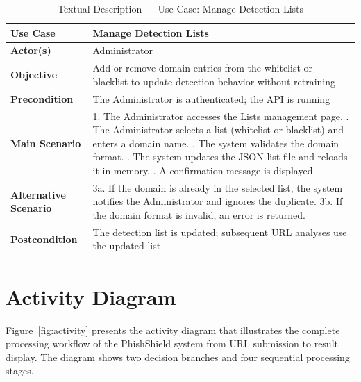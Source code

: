 \begin{table}[H]
\caption{Textual Description — Use Case: Manage Detection Lists}
\label{tab:uc2}
\vspace{4pt}
\centering
\begin{tabular}{|p{3.5cm}|p{9cm}|}
\hline
\textbf{Use Case} & Manage Detection Lists \\
\hline
\textbf{Actor(s)} & Administrator \\
\hline
\textbf{Objective} & Add or remove domain entries from the whitelist or blacklist to update detection behavior without retraining \\
\hline
\textbf{Precondition} & The Administrator is authenticated; the API is running \\
\hline
\textbf{Main Scenario} &
1. The Administrator accesses the Lists management page. \newline
2. The Administrator selects a list (whitelist or blacklist) and enters a domain name. \newline
3. The system validates the domain format. \newline
4. The system updates the JSON list file and reloads it in memory. \newline
5. A confirmation message is displayed. \\
\hline
\textbf{Alternative Scenario} & 3a. If the domain is already in the selected list, the system notifies the Administrator and ignores the duplicate. \newline
3b. If the domain format is invalid, an error is returned. \\
\hline
\textbf{Postcondition} & The detection list is updated; subsequent URL analyses use the updated list \\
\hline
\end{tabular}
\end{table}

\section{Activity Diagram}

Figure~\ref{fig:activity} presents the activity diagram that illustrates the complete processing workflow of the PhishShield system from URL submission to result display. The diagram shows two decision branches and four sequential processing stages.


